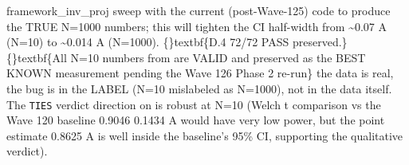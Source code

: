 \documentclass{article}
\begin{document}
framework\_inv\_proj sweep with the current (post-Wave-125) code to produce the TRUE N=1000 numbers; this will tighten the CI half-width from \textasciitilde{}0.07 A (N=10) to \textasciitilde{}0.014 A (N=1000). \{\}textbf\{D.4 72/72 PASS preserved.\} \{\}textbf\{All N=10 numbers from  are VALID and preserved as the BEST KNOWN measurement pending the Wave 126 Phase 2 re-run\}  the data is real, the bug is in the LABEL (N=10 mislabeled as N=1000), not in the data itself. The \texttt{TIES} verdict direction on  is robust at N=10 (Welch t comparison vs the Wave 120 baseline 0.9046  0.1434 A would have very low power, but the point estimate 0.8625 A is well inside the baseline's 95\% CI, supporting the qualitative verdict).
\end{document}
